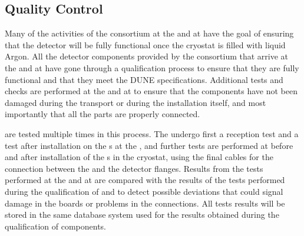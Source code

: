
\subsection{Quality Control}
\label{sec:fdsp-tpcelec-integration-qc}

Many of the activities of the 
consortium at the  and at \surf have the goal of 
ensuring that the detector will be fully functional once the cryostat
is filled with liquid Argon. All the detector components provided
by the  consortium that arrive at the 
and at \surf have gone through a qualification process to ensure
that they are fully functional and that they meet the DUNE 
specifications. Additional tests and checks are performed at the
 and at \surf to ensure that the components have not
been damaged during the transport or during the installation itself,
and most importantly that all the parts are properly connected.

 are tested multiple times in this process. 
The  undergo first a reception test and a test after 
installation on the s at the , and further 
tests are performed at \surf before and after installation of the 
s in the cryostat, using the final cables for the 
connection between the  and the detector flanges. 
Results from the tests performed at
the  and at \surf are compared with the results of the
tests performed during the qualification of  and
 to detect possible deviations that could signal 
damage in the boards or problems in the connections. All tests 
results will be stored in the same database system used for
the results obtained during the qualification of components.

